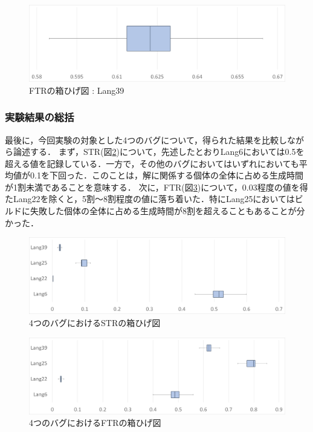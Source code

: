 \documentclass[uplatex,dvipdfmx,a4paper]{jsarticle}
\begin{document}
\begin{figure}[t]
  \centering
  \includegraphics[width=\linewidth]{fig/Lang39_boxplot_FTR.png}
  \caption{FTRの箱ひげ図 : Lang39}
  \label{fig:Lang39_boxplot_FTR}
\end{figure}
\subsubsection{実験結果の総括}
最後に，今回実験の対象とした4つのバグについて，得られた結果を比較しながら論述する．
まず，STR(図\ref{fig:summary_STR})について，先述したとおりLang6においては0.5を超える値を記録している．一方で，その他のバグにおいてはいずれにおいても平均値が0.1を下回った．このことは，解に関係する個体の全体に占める生成時間が1割未満であることを意味する．
次に，FTR(図\ref{fig:summary_FTR})について，0.03程度の値を得たLang22を除くと，5割～8割程度の値に落ち着いた．特にLang25においてはビルドに失敗した個体の全体に占める生成時間が8割を超えることもあることが分かった．
\begin{figure}[t]
  \centering
  \includegraphics[width=\linewidth]{fig/summary_STR.png}
  \caption{4つのバグにおけるSTRの箱ひげ図}
  \label{fig:summary_STR}
\end{figure}
\begin{figure}[t]
  \centering
  \includegraphics[width=\linewidth]{fig/summary_FTR.png}
  \caption{4つのバグにおけるFTRの箱ひげ図}
  \label{fig:summary_FTR}
\end{figure}
\clearpage
\end{document}
